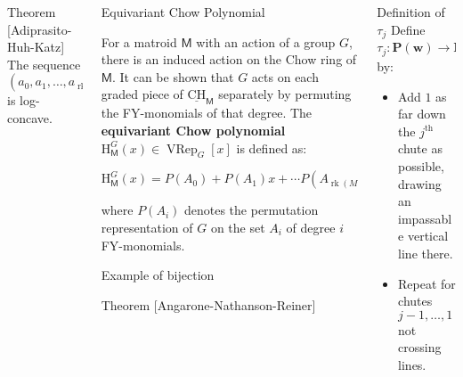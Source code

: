 \documentclass[final]{beamer}
\newlength{\onecolwid}
\newlength{\twocolwid}
\newlength{\threecolwid}
\DeclareMathOperator{\rk}{rk}
\newcommand{\M}{\mathsf{M}}
\renewcommand{\H}{\mathrm{H}}
\newcommand{\uCH}{\underline{\mathrm{CH}}}
\newcommand{\VRep}{\operatorname{VRep}}
\newcommand{\bw}{\mathbf{w}}
\newcommand{\bP}{\mathbf{P}}
\newcommand{\be}{\mathbf{e}}
\begin{document}
\begin{frame}[t]
\begin{columns}[t]
\begin{column}{\onecolwid}
\begin{alertblock}{Theorem [Adiprasito-Huh-Katz]}
The sequence \((a_0,a_1,\ldots, a_{\rk(M)-1})\) is log-concave.
\end{alertblock}

\vspace{-2mm}

\end{column} %

\begin{column}{\twocolwid} %

\begin{block}{Equivariant Chow Polynomial}

For a matroid $\M$ with an action of a group $G$, there is an
induced action on the Chow ring of $\M$. It can be shown that
$G$ acts on each graded piece of $\uCH_\M$ separately by permuting
the FY-monomials of that degree. The
\textbf{equivariant Chow polynomial}
$\H^G_\M(x)\in\VRep_G[x]$ is defined as:

\[\H_\M^G(x) = P(A_0)+P(A_1)x+\cdots P(A_{\rk(M)-1})x^{\rk(M)-1}\]

where $P(A_i)$ denotes the permutation representation of $G$ on the
set $A_i$ of degree $i$ FY-monomials.

\end{block}


\begin{block}{Example of bijection}
\end{block}

\vspace{-11mm}
\begin{alertblock}{Theorem [Angarone-Nathanson-Reiner]}

\end{alertblock}

\end{column} %

\begin{column}{\threecolwid} %

\begin{block}{Definition of $\tau_j$}
Define $\tau_j : \bP(\bw) \rightarrow \bP(\bw + \be_1 + \ldots + \be_j)$ by:
\begin{itemize}
\item Add $1$ as far down the $j^{\mathrm{th}}$ chute as possible, drawing an impassable vertical line there.
\item Repeat for chutes $j-1,\ldots, 1$ not crossing lines.
\end{itemize}
\end{block}


\end{column}
\end{columns}
\end{frame}
\end{document}
